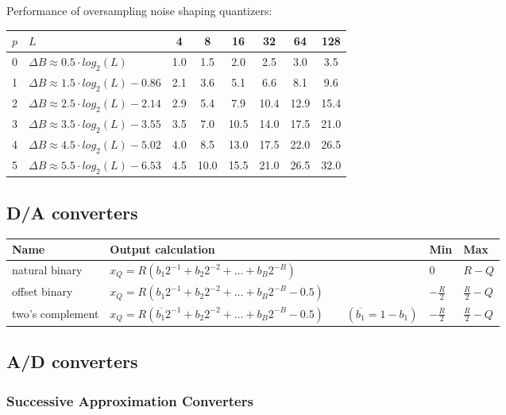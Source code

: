 Performance of oversampling noise shaping quantizers:

\begin{tabularx}{0.75\textwidth}{|c|X|c|c|c|c|c|c|}
	\hline
	$p$	& $L$							& 4		& 8		& 16	& 32	& 64	& 128
	\\ \hline
	0	& $\Delta B \approx 0.5 \cdot log_2(L)$		& 1.0	& 1.5	& 2.0	& 2.5	& 3.0	& 3.5 \\
	1	& $\Delta B \approx 1.5 \cdot log_2(L) - 0.86$ & 2.1	& 3.6	& 5.1	& 6.6	& 8.1	& 9.6 \\
	2	& $\Delta B \approx 2.5 \cdot log_2(L) - 2.14$	& 2.9	& 5.4	& 7.9	& 10.4	& 12.9	& 15.4 \\
	3	& $\Delta B \approx 3.5 \cdot log_2(L) - 3.55$	& 3.5	& 7.0	& 10.5	& 14.0	& 17.5	& 21.0 \\
	4	& $\Delta B \approx 4.5 \cdot log_2(L) - 5.02$	& 4.0	& 8.5	& 13.0	& 17.5	& 22.0	& 26.5 \\
	5	& $\Delta B \approx 5.5 \cdot log_2(L) - 6.53$	& 4.5	& 10.0	& 15.5	& 21.0	& 26.5	& 32.0 \\
	\hline
\end{tabularx}
\resetArrayStretch


\subsection{D/A converters}
\begin{tabularx}{\textwidth}{|l|X|l|l|}
	\hline
	\textbf{Name} & \textbf{Output calculation} & \textbf{Min} & \textbf{Max}
	\\ \hline
	natural binary
	& $x_Q = R(b_1 2^{-1} + b_2 2^{-2} + \ldots + b_B 2^{-B})$ 
	& $0$
	& $R-Q$
	\\ \hline
	offset binary
	& $x_Q = R(b_1 2^{-1} + b_2 2^{-2} + \ldots + b_B 2^{-B} - 0.5)$ 
	& $-\frac{R}{2}$ 
	& $\frac{R}{2} - Q$ 
	\\ \hline
	two's complement
	& $x_Q = R(\overline{b_1} 2^{-1} + b_2 2^{-2} + \ldots + b_B 2^{-B} - 0.5) \qquad (\overline{b_1}=1-b_1)$
	& $-\frac{R}{2}$ 
	& $\frac{R}{2} - Q$ 
	\\ \hline
\end{tabularx}


\subsection{A/D converters}

\subsubsection{Successive Approximation Converters}

